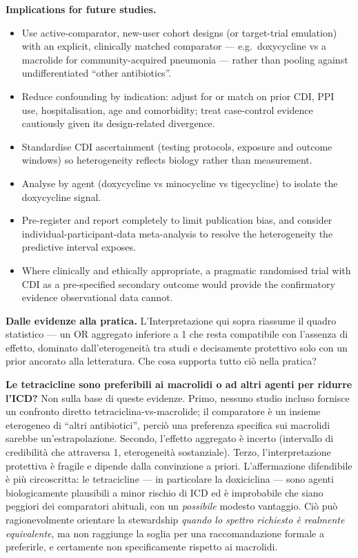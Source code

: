 \documentclass[
  letterpaper,
  DIV=11,
  numbers=noendperiod]{scrartcl}
\providecommand{\tightlist}{%
  \setlength{\itemsep}{0pt}\setlength{\parskip}{0pt}}
\begin{document}
\textbf{Implications for future studies.}

\begin{itemize}
\tightlist
\item
  Use active-comparator, new-user cohort designs (or target-trial
  emulation) with an explicit, clinically matched comparator ---
  e.g.~doxycycline vs a macrolide for community-acquired pneumonia ---
  rather than pooling against undifferentiated ``other antibiotics''.
\item
  Reduce confounding by indication: adjust for or match on prior CDI,
  PPI use, hospitalisation, age and comorbidity; treat case-control
  evidence cautiously given its design-related divergence.
\item
  Standardise CDI ascertainment (testing protocols, exposure and outcome
  windows) so heterogeneity reflects biology rather than measurement.
\item
  Analyse by agent (doxycycline vs minocycline vs tigecycline) to
  isolate the doxycycline signal.
\item
  Pre-register and report completely to limit publication bias, and
  consider individual-participant-data meta-analysis to resolve the
  heterogeneity the predictive interval exposes.
\item
  Where clinically and ethically appropriate, a pragmatic randomised
  trial with CDI as a pre-specified secondary outcome would provide the
  confirmatory evidence observational data cannot.
\end{itemize}

\textbf{Dalle evidenze alla pratica.} L'Interpretazione qui sopra
riassume il quadro statistico --- un OR aggregato inferiore a 1 che
resta compatibile con l'assenza di effetto, dominato dall'eterogeneità
tra studi e decisamente protettivo solo con un prior ancorato alla
letteratura. Che cosa supporta tutto ciò nella pratica?

\textbf{Le tetracicline sono preferibili ai macrolidi o ad altri agenti
per ridurre l'ICD?} Non sulla base di queste evidenze. Primo, nessuno
studio incluso fornisce un confronto diretto tetraciclina-vs-macrolide;
il comparatore è un insieme eterogeneo di ``altri antibiotici'', perciò
una preferenza specifica sui macrolidi sarebbe un'estrapolazione.
Secondo, l'effetto aggregato è incerto (intervallo di credibilità che
attraversa 1, eterogeneità sostanziale). Terzo, l'interpretazione
protettiva è fragile e dipende dalla convinzione a priori.
L'affermazione difendibile è più circoscritta: le tetracicline --- in
particolare la doxiciclina --- sono agenti biologicamente plausibili a
minor rischio di ICD ed è improbabile che siano peggiori dei comparatori
abituali, con un \emph{possibile} modesto vantaggio. Ciò può
ragionevolmente orientare la stewardship \emph{quando lo spettro
richiesto è realmente equivalente}, ma non raggiunge la soglia per una
raccomandazione formale a preferirle, e certamente non specificamente
rispetto ai macrolidi.
\end{document}
